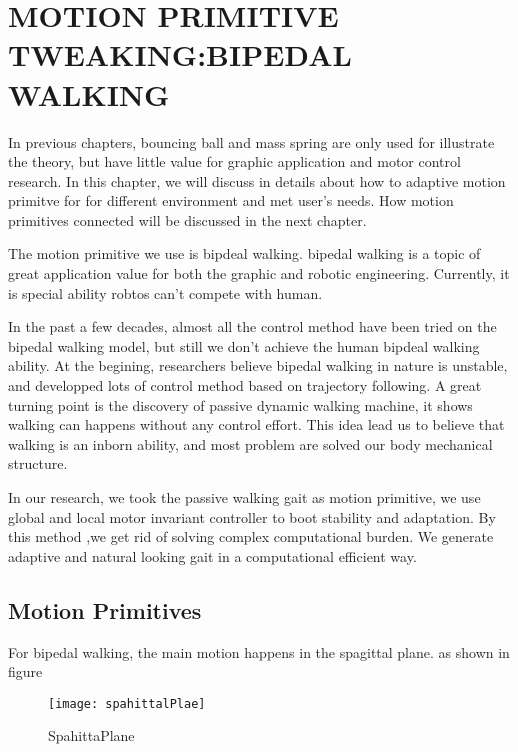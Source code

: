 \chapter{MOTION PRIMITIVE TWEAKING:BIPEDAL WALKING}
\label{chap:walk}

\ifpdf
    \graphicspath{{BipedWalk/BipedWalkFigs/PNG/}{BipedWalk/BipedWalkFigs/PDF/}{BipedWalk/BipedWalkFigs/}}
\else
    \graphicspath{{BipedWalk/BipedWalkFigs/EPS/}{BipedWalk/BipedWalkFigs/}}
\fi

In previous chapters, bouncing ball and mass spring are only used for illustrate the theory, but have little value for graphic application and motor control research.
In this chapter, we will discuss in details about how to adaptive motion primitve for for different environment and met user's needs.
How motion primitives connected will be discussed in the next chapter.


The motion primitive we use is bipdeal walking.
bipedal walking is a topic of great application value for both the graphic and robotic engineering.
Currently, it is special ability robtos can't compete with human.

In the past a few decades, almost all the control method have been tried on the bipedal walking model, but still we don't achieve the human bipdeal walking ability.
At the begining, researchers believe bipedal walking in nature is unstable, and developped lots of control method based on trajectory following.
A great turning point is the discovery of passive dynamic walking machine, it shows walking can happens without any control effort.
This idea lead us to believe that walking is an inborn ability, and most problem are solved our body mechanical structure.

In our research, we took the passive walking gait as motion primitive, we use global and local motor invariant controller to boot stability and adaptation.
By this method ,we get rid of solving complex computational burden.
We generate adaptive and natural looking gait in a computational efficient way.


\section{Motion Primitives}


For bipedal walking, the main motion happens in the spagittal plane.
as shown in figure
\begin{figure}[!htbp]
  \begin{center}
      \texttt{[image: spahittalPlae]}
    \caption{SpahittaPlane}
    \label{fig:passivekneewalker}
\end{center}
\end{figure}



